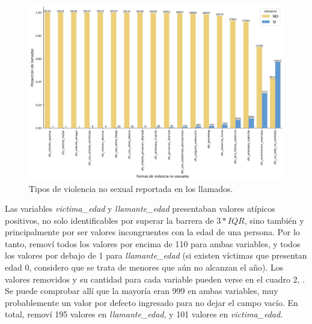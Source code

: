 \documentclass[10 pt]{article}
\begin{document}
\begin{figure}[H]
\begin{center}
\includegraphics[scale=.5]{images/latex_ofv_sino.jpeg}
\caption{Tipos de violencia no sexual reportada en los llamados.}
\label{ofvsino}
\end{center}
\end{figure} 



Las variables \textit{victima\_edad} y \textit{llamante\_edad} presentaban valores atípicos positivos, no solo identificables por superar la barrera de \(3*IQR\), sino también y principalmente por ser valores incongruentes con la edad de una persona. Por lo tanto, removí todos los valores por encima de 110 para ambas variables, y todos los valores por debajo de 1 para \textit{llamante\_edad} (si existen víctimas que presentan edad 0, considero que se trata de menores que aún no alcanzan el año). Los valores removidos y su cantidad para cada variable pueden verse en el cuadro 2, . Se puede comprobar allí que la mayoría eran 999 en ambas variables, muy probablemente un valor por defecto ingresado para no dejar el campo vacío. En total, removí 195 valores en \textit{llamante\_edad}, y 101 valores en \textit{victima\_edad}. 
\end{document}
